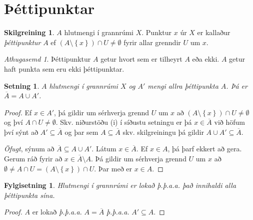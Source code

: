 \documentclass[a4paper,icelandic]{book}
\theoremstyle{definition}
\newtheorem{skilgr}{Skilgreining}[section]
\theoremstyle{plain}
\newtheorem{setn}{Setning}[section]
\newtheorem{fylgisetn}{Fylgisetning}[section]
\theoremstyle{remark}
\newtheorem*{ath}{Athugasemd}
\begin{document}
\section{Þéttipunktar}
\begin{skilgr}
  $A$ hlutmengi í grannrúmi $X$. Punktur $x$ úr $X$ er kallaður
  \emph{þéttipunktur} $A$ ef $(A\setminus\left\{ x
  \right\})\cap U\neq\emptyset$ fyrir allar grenndir $U$ um $x$.
\end{skilgr}
\begin{ath}
  Þéttipunktur $A$ getur hvort sem er tilheyrt $A$ eða ekki. $A$ getur haft
  punkta sem eru ekki þéttipunktar.
\end{ath}
\begin{setn}
  $A$ hlutmengi í grannrúmi $X$ og $A'$ mengi allra þéttipunkta $A$. Þá er
  $\overline A = A\cup A'$.
\end{setn}
\begin{proof}
  Ef $x\in A'$, þá gildir um sérhverja grennd $U$ um $x$ að $(A\setminus\left\{
  x \right\})\cap U \neq \emptyset$ og því $A\cap U\neq \emptyset$. Skv.
  niðurstöðu (i) í síðustu setningu er þá $x\in\overline A$ við höfum því sýnt
  að $A'\subseteq \overline A$ og þar sem $A\subseteq \overline A$ skv.
  skilgreiningu þá gildir $A\cup A' \subseteq \overline A$.

  \emph{Öfugt}, sýnum að $\overline A\subseteq A\cup A'$. Látum $x\in\overline
  A$. Ef $x\in A$, þá þarf ekkert að gera. Gerum ráð fyrir að $x\in\overline
  A\setminus A$. Þá gildir um sérhverja grennd $U$ um $x$ að $\emptyset \neq
  A\cap U = (A\setminus \left\{ x \right\})\cap U$. Þar með er $x\in A$.
\end{proof}
\begin{fylgisetn}
  Hlutmengi í grannrúmi er lokað \emph{þ.þ.a.a.} það innihaldi alla þéttipunkta
  sína.
\end{fylgisetn}
\begin{proof}
  $A$ er lokað \emph{þ.þ.a.a.} $A = \overline A$ \emph{þ.þ.a.a.} $A'\subseteq A$.
\end{proof}
\end{document}
